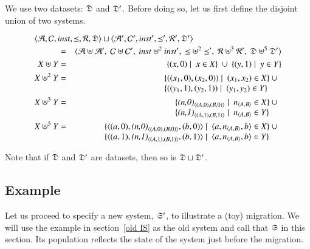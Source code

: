 \documentclass{elsarticle}
\begin{document}
   We use two datasets: $\mathfrak{D}$ and $\mathfrak{D}'$.
   Before doing so, let us first define the disjoint union of two systems.
\begin{definition}
\begin{eqnarray}
   \omit\rlap{$\la\atoms,\concepts,\inst,\isa,\rels,\dataset\ra\sqcup\la\atoms',\concepts',\inst',\isa',\rels',\dataset'\ra$}\notag\\
   &=&\la\atoms\uplus\atoms',\ \concepts\uplus\concepts',\ \inst\uplus^2\inst',\ \isa\uplus^2\isa',\ \rels\uplus^3\rels',\ \dataset\uplus^5\dataset'\ra\notag\\
      X\uplus Y&=&\{(x,0)\mid\ x\in X\}\ \cup\ \{(y,1)\mid\ y\in Y\}\\
      X\uplus^2 Y&=&\begin{array}[t]{@{}l}\{((x_1,0),(x_2,0))\mid\ (x_1,x_2)\in X\}\ \cup\\ \{((y_1,1),(y_2,1))\mid\ (y_1,y_2)\in Y\}\end{array}\\
      X\uplus^3 Y&=&\begin{array}[t]{@{}l}\{\declare{(n,0)}{(A,0)}{(B,0)}\mid\ \declare{n}{A}{B}\in X\}\ \cup\\ \{\declare{(n,1)}{(A,1)}{(B,1)}\mid\ \declare{n}{A}{B}\in Y\}\end{array}\\
      X\uplus^5 Y&=&\begin{array}[t]{@{}l}\{\triple{(a,0)}{\declare{(n,0)}{(A,0)}{(B,0)}}{(b,0)}\mid\ \triple{a}{\declare{n}{A}{B}}{b}\in X\}\ \cup\\ \{\triple{(a,1)}{\declare{(n,1)}{(A,1)}{(B,1)}}{(b,1)}\mid\ \triple{a}{\declare{n}{A}{B}}{b}\in Y\}\end{array}
\end{eqnarray}
\end{definition}
Note that if $\mathfrak{D}$ and $\mathfrak{D}'$ are datasets, then so is $\mathfrak{D}\sqcup\mathfrak{D}'$.

\subsection{Example}
   Let us proceed to specify a new system, $\mathfrak{S}'$, to illustrate a (toy) migration.
   We will use the example in section~\ref{old IS} as the old system
   and call that $\mathfrak{S}$ in this section.
   Its population reflects the state of the system just before the migration.
\end{document}
